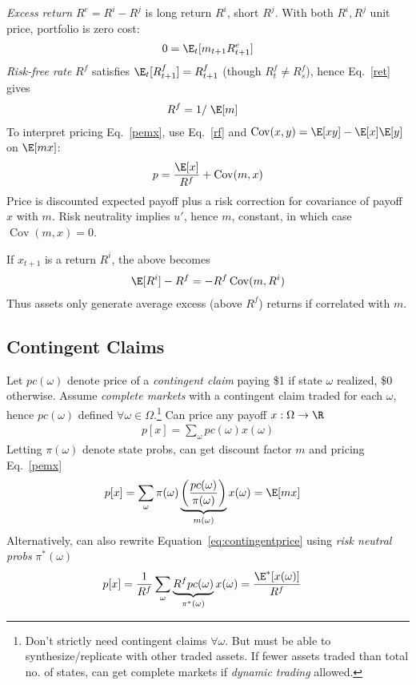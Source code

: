 \documentclass[12pt]{article}
\theoremstyle{plain}
\theoremstyle{definition}
\theoremstyle{remark}
\newcommand{\ra}{\rightarrow}
\newcommand{\Cov}{\operatorname{Cov}}
\begin{document}
\begin{multicols*}{2}
\emph{Excess return} $R^e=R^i-R^j$ is long return $R^i$, short $R^j$.
With both $R^i,R^j$ unit price, portfolio is zero cost:
\begin{align*}
  0 = \E_t[m_{t+1}R^e_{t+1}]
\end{align*}
\emph{Risk-free rate} $R^f$ satisfies $\E_t[R^f_{t+1}]=R^f_{t+1}$
(though $R^f_t\neq R^f_s$), hence Eq.~\ref{ret} gives
\begin{align}
  R^f
  &= 1/\;\E[m]
  \label{rf}
\end{align}
To interpret pricing Eq.~\ref{pemx}, use Eq.~\ref{rf} and
$\Cov(x,y)=\E[xy] - \E[x]\E[y]$ on $\E[mx]$:
\begin{align}
  p =  \frac{\E[x]}{R^f} + \Cov(m,x)
  \label{riskadj}
\end{align}
Price is discounted expected payoff plus a risk
correction for covariance of payoff $x$ with $m$.
Risk neutrality implies $u'$, hence $m$, constant, in which case
$\Cov(m,x)=0$.

If $x_{t+1}$ is a return $R^i$, the above becomes
\begin{align}
  \E[R^i] - R^f =  -R^f \Cov(m,R^i)
  \label{riskadjret}
\end{align}
Thus assets only generate average excess (above $R^f$) returns if
correlated with $m$.

\subsection{Contingent Claims}

Let $pc(\omega)$ denote price of a \emph{contingent claim} paying \$1
if state $\omega$ realized, \$0 otherwise.
Assume \emph{complete markets} with a contingent claim traded
for each $\omega$, hence $pc(\omega)$ defined $\forall
\omega\in\Omega$.\footnote{
  Don't strictly need contingent claims $\forall\omega$.
  But must be able to synthesize/replicate with other traded assets.
  If fewer assets traded than total no. of states, can get
  complete markets if \emph{dynamic trading} allowed.
}
Can price any payoff $x:\Omega\ra\R$
\begin{align}
  p[x]
  = \sum_\omega pc(\omega) x(\omega)
  \label{eq:contingentprice}
\end{align}
Letting $\pi(\omega)$ denote state probs, can get discount factor $m$
and pricing Eq.~\ref{pemx}
\begin{align*}
  p[x]
  &= \sum_\omega
  \pi(\omega)
  \underbrace{%
  \left(
  \frac{pc(\omega)}{\pi(\omega)}
  \right)
  }_{m(\omega)}
  x(\omega)
  = \E[mx]
\end{align*}
Alternatively, can also rewrite Equation~\ref{eq:contingentprice} using
\emph{risk neutral probs} $\pi^*(\omega)$
\begin{align*}
  p[x]
  &= \frac{1}{R^f} \sum_\omega
  \underbrace{R^f pc(\omega)}_{\pi^*(\omega)}x(\omega)
  = \frac{\E^*[x(\omega)]}{R^f}
\end{align*}





\end{multicols*}
\end{document}
